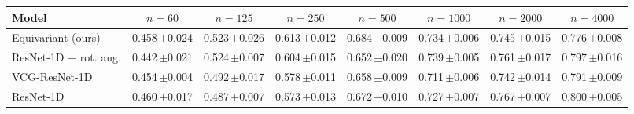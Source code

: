 \begin{tabular}{lccccccc}
\toprule
Model & $n=60$ & $n=125$ & $n=250$ & $n=500$ & $n=1000$ & $n=2000$ & $n=4000$ \\
\midrule
  Equivariant (ours) & 0.458\,\tiny{$\pm$0.024} & 0.523\,\tiny{$\pm$0.026} & 0.613\,\tiny{$\pm$0.012} & 0.684\,\tiny{$\pm$0.009} & 0.734\,\tiny{$\pm$0.006} & 0.745\,\tiny{$\pm$0.015} & 0.776\,\tiny{$\pm$0.008} \\
  ResNet-1D + rot. aug. & 0.442\,\tiny{$\pm$0.021} & 0.524\,\tiny{$\pm$0.007} & 0.604\,\tiny{$\pm$0.015} & 0.652\,\tiny{$\pm$0.020} & 0.739\,\tiny{$\pm$0.005} & 0.761\,\tiny{$\pm$0.017} & 0.797\,\tiny{$\pm$0.016} \\
  VCG-ResNet-1D & 0.454\,\tiny{$\pm$0.004} & 0.492\,\tiny{$\pm$0.017} & 0.578\,\tiny{$\pm$0.011} & 0.658\,\tiny{$\pm$0.009} & 0.711\,\tiny{$\pm$0.006} & 0.742\,\tiny{$\pm$0.014} & 0.791\,\tiny{$\pm$0.009} \\
  ResNet-1D & 0.460\,\tiny{$\pm$0.017} & 0.487\,\tiny{$\pm$0.007} & 0.573\,\tiny{$\pm$0.013} & 0.672\,\tiny{$\pm$0.010} & 0.727\,\tiny{$\pm$0.007} & 0.767\,\tiny{$\pm$0.007} & 0.800\,\tiny{$\pm$0.005} \\
\bottomrule
\end{tabular}